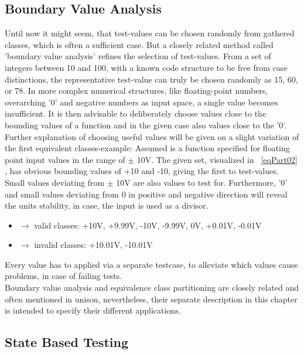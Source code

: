 	\subsection{Boundary Value Analysis} %
	Until now it might seem, that test-values can be chosen randomly from gathered classes, which is often a sufficient case. But a closely related method called 'boundary value analysis' refines the selection of test-values. From a set of integers between 10 and 100, with a known code structure to be free from case distinctions, the representative test-value can truly be chosen randomly as 15, 60, or 78. In more complex numerical structures, like floating-point numbers, overarching '0' and negative numbers as input space, a single value becomes insufficient. It is then advisable to deliberately choose values close to the bounding values of a function and in the given case also values close to the '0'.
	Further explanation of choosing useful values will be given on a slight variation of the first equivalent classes-example: Assumed is a function specified for floating point input values in the range of $\pm$ 10V. 
	The given set, visualized in ~\ref{eqPart02}  , has obvious bounding values of +10 and -10, giving the first to test-values. Small values deviating from $\pm$ 10V are also values to test for. Furthermore, '0' and small values deviating from 0 in positive and negative direction will reveal the units stability, in case, the input is used as a divisor. \\
	\begin{itemize}[label={}]
		\item	$\rightarrow$ valid classes: +10V, +9.99V, -10V, -9.99V, 0V, +0.01V, -0.01V \\
		\item	$\rightarrow$ invalid classes: +10.01V, -10.01V \\
	\end{itemize}
	Every value has to applied via a separate testcase, to alleviate which values cause problems, in case of failing tests. \\
	Boundary value analysis and equivalence class partitioning are closely related and often mentioned in unison, nevertheless, their separate description in this chapter is intended to specify their different applications.
		
	\subsection{State Based Testing}

